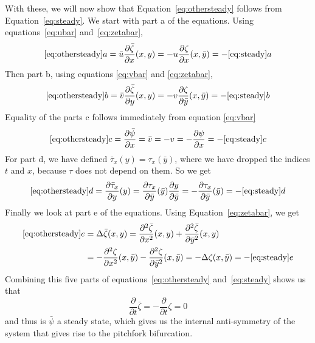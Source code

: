 With these, we will now show that Equation~\eqref{eq:othersteady} follows from Equation~\eqref{eq:steady}.
We start with part a of the equations. Using equations~\eqref{eq:ubar} and~\eqref{eq:zetabar},
\begin{equation}
\ref{eq:othersteady} a=\bar u\frac{\partial\bar{\zeta}}{\partial x} (x,y) =-u \frac{\partial\zeta}{\partial x} (x,\bar y)=-\ref{eq:steady}a
\end{equation}
Then part b, using equations \eqref{eq:vbar} and \eqref{eq:zetabar},
\begin{equation}
\ref{eq:othersteady}b=\bar{v}\frac{\partial\bar{\zeta}}{\partial y} (x,y) =-v \frac{\partial\zeta}{\partial \bar y} (x,\bar y)=-\ref{eq:steady}b
\end{equation}
Equality of the parts c follows immediately from equation \ref{eq:vbar}
$$\ref{eq:othersteady}c=\frac{\partial \bar{\psi}}{\partial x}=\bar{v}=-v=-\frac{\partial \psi}{\partial x}=-\ref{eq:steady}c$$
For part d, we have defined $\bar{\tau}_x(y)=\tau_x(\bar y)$, where we have dropped the indices $t$ and $x$, because $\tau$ does not depend on them. So we get
$$\ref{eq:othersteady}d=\frac{\partial \bar \tau_x}{\partial y}(y)=\frac{\partial \tau_x}{\partial \bar y}(\bar y)\frac{\partial y}{\partial \bar y}=-\frac{\partial \tau_x}{\partial \bar y}(\bar y)=-\ref{eq:steady}d$$
Finally we look at part e of the equations. Using Equation~\eqref{eq:zetabar}, we get
\begin{align}
\ref{eq:othersteady}e& =\Delta \bar{\zeta}(x,y)
=\frac{\partial^2\bar{\zeta}}{\partial x^2}(x, y)+\frac{\partial^2\bar{\zeta}}{\partial \bar y^2}(x, y) \\
&=-\frac{\partial^2\zeta}{\partial x^2}(x,\bar y)-\frac{\partial^2\zeta}{\partial \bar y^2}(x,\bar y)=-\Delta\zeta(x,\bar y)=-\ref{eq:steady} e
\end{align}
Combining this five parts of equations~\eqref{eq:othersteady} and~\eqref{eq:steady} shows us that
$$\frac{\partial}{\partial t}\bar{\zeta}=-\frac{\partial}{\partial t}\zeta=0$$ and thus is $\bar{\psi}$ a steady state, which gives us the internal anti-symmetry of the system that gives rise to the pitchfork bifurcation.



